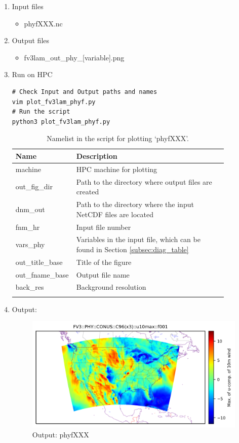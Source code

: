 \documentclass[11pt,fleqn]{report}              %
\begin{document}
\begin{enumerate}
\item Input files
\begin{itemize}
\item phyfXXX.nc
\end{itemize}
\item Output files
\begin{itemize}
\item fv3lam\_out\_phy\_[variable].png
\end{itemize}
\item Run on HPC

\lstset{language=bash}   
\begin{lstlisting}[frame=trBL]
# Check Input and Output paths and names
vim plot_fv3lam_phyf.py
# Run the script
python3 plot_fv3lam_phyf.py
\end{lstlisting}

{
\fontsize{10}{12}\selectfont
\begin{longtable}{p{0.17\linewidth} | p{0.7\linewidth} }
\hline
\hline
Name & Description \\
\hline
 machine & HPC machine for plotting \\
 out\_fig\_dir & Path to the directory where output files are created \\
 dnm\_out & Path to the directory where the input NetCDF files are located   \\
 fnm\_hr & Input file number \\
 vars\_phy & Variables in the input file, which can be found in Section \ref{subsec:diag_table}\\
 out\_title\_base & Title of the figure \\
 out\_fname\_base & Output file name \\
 back\_res & Background resolution \\
\hline
\caption{Namelist in the script for plotting `phyfXXX'.}
\label{table:fv3_var_phy}
\end{longtable}
}

\item Output:

\begin{figure}[ht!]
  \centering
  \includegraphics[width=0.8\linewidth]{fv3_out_phy_CONUS_C96_u10max_f001.png}
  \caption{Output: phyfXXX}
  \label{fig:py_out_phy}
\end{figure}

\end{enumerate}
\end{document}
